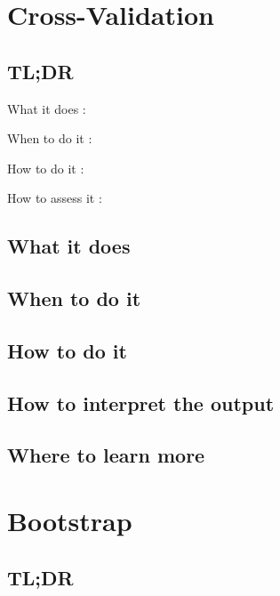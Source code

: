 \documentclass[
]{book}
\begin{document}
\hypertarget{cross-validation}{%
\chapter{Cross-Validation}\label{cross-validation}}

\hypertarget{tldr-9}{%
\section{TL;DR}\label{tldr-9}}

What it does
:

When to do it
:

How to do it
:

How to assess it
:

\hypertarget{what-it-does-9}{%
\section{What it does}\label{what-it-does-9}}

\hypertarget{when-to-do-it-9}{%
\section{When to do it}\label{when-to-do-it-9}}

\hypertarget{how-to-do-it-9}{%
\section{How to do it}\label{how-to-do-it-9}}

\hypertarget{how-to-interpret-the-output-9}{%
\section{How to interpret the output}\label{how-to-interpret-the-output-9}}

\hypertarget{where-to-learn-more-9}{%
\section{Where to learn more}\label{where-to-learn-more-9}}

\hypertarget{bootstrap}{%
\chapter{Bootstrap}\label{bootstrap}}

\hypertarget{tldr-10}{%
\section{TL;DR}\label{tldr-10}}
\end{document}
